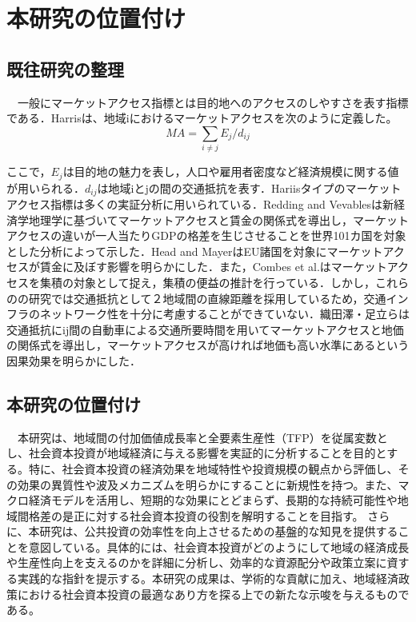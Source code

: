 \chapter{本研究の位置付け}

\section{既往研究の整理}
　一般にマーケットアクセス指標とは目的地へのアクセスのしやすさを表す指標である．Harris\cite{harrisc1954}は、地域iにおけるマーケットアクセスを次のように定義した。
\[ MA = \sum_{i \neq j}{E_{j}/d_{ij}}\]

ここで，$E_{j}$は目的地の魅力を表し，人口や雇用者密度など経済規模に関する値が用いられる．$d_{ij}$は地域iとjの間の交通抵抗を表す．Hariisタイプのマーケットアクセス指標は多くの実証分析に用いられている．Redding and Vevables\cite{redding2004}は新経済学地理学に基づいてマーケットアクセスと賃金の関係式を導出し，マーケットアクセスの違いが一人当たりGDPの格差を生じさせることを世界101カ国を対象とした分析によって示した．Head and Mayer\cite{head2006}はEU諸国を対象にマーケットアクセスが賃金に及ぼす影響を明らかにした．また，Combes et al.\cite{combes2010}はマーケットアクセスを集積の対象として捉え，集積の便益の推計を行っている．しかし，これらのの研究では交通抵抗として２地域間の直線距離を採用しているため，交通インフラのネットワーク性を十分に考慮することができていない．織田澤・足立ら\cite{otazawa2022}は交通抵抗にij間の自動車による交通所要時間を用いてマーケットアクセスと地価の関係式を導出し，マーケットアクセスが高ければ地価も高い水準にあるという因果効果を明らかにした．
 
\section{本研究の位置付け}
　本研究は、地域間の付加価値成長率と全要素生産性（TFP）を従属変数とし、社会資本投資が地域経済に与える影響を実証的に分析することを目的とする。特に、社会資本投資の経済効果を地域特性や投資規模の観点から評価し、その効果の異質性や波及メカニズムを明らかにすることに新規性を持つ。また、マクロ経済モデルを活用し、短期的な効果にとどまらず、長期的な持続可能性や地域間格差の是正に対する社会資本投資の役割を解明することを目指す。
さらに、本研究は、公共投資の効率性を向上させるための基盤的な知見を提供することを意図している。具体的には、社会資本投資がどのようにして地域の経済成長や生産性向上を支えるのかを詳細に分析し、効率的な資源配分や政策立案に資する実践的な指針を提示する。本研究の成果は、学術的な貢献に加え、地域経済政策における社会資本投資の最適なあり方を探る上での新たな示唆を与えるものである。
